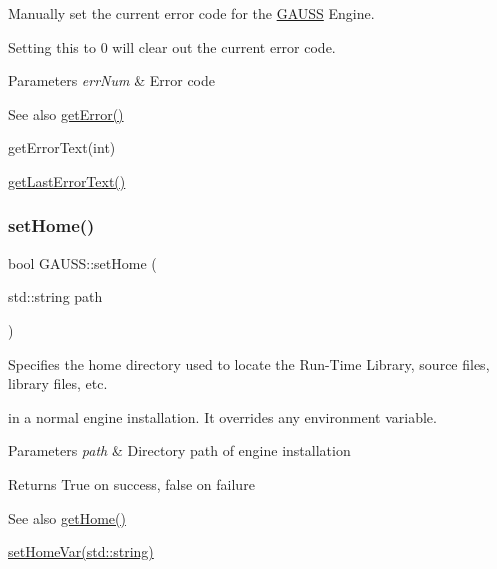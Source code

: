 Manually set the current error code for the \hyperlink{class_g_a_u_s_s}{G\+A\+U\+SS} Engine. 

Setting this to 0 will clear out the current error code.


\begin{DoxyParams}{Parameters}
{\em err\+Num} & Error code\\
\hline
\end{DoxyParams}
\begin{DoxySeeAlso}{See also}
\hyperlink{class_g_a_u_s_s_a214b7c251ff80099c04a49e5b5032926}{get\+Error()} 

get\+Error\+Text(int) 

\hyperlink{class_g_a_u_s_s_a4d8c56b05b0878aa3831ba465c409235}{get\+Last\+Error\+Text()} 
\end{DoxySeeAlso}
\mbox{\label{class_g_a_u_s_s_ac34645a05f3aca7d56d11d0b895fb33a}} 
\subsubsection{\texorpdfstring{set\+Home()}{setHome()}}
{\footnotesize\ttfamily bool G\+A\+U\+S\+S\+::set\+Home (\begin{DoxyParamCaption}\item[{std\+::string}]{path }\end{DoxyParamCaption})}



Specifies the home directory used to locate the Run-\/\+Time Library, source files, library files, etc. 

in a normal engine installation. It overrides any environment variable.


\begin{DoxyParams}{Parameters}
{\em path} & Directory path of engine installation \\
\hline
\end{DoxyParams}
\begin{DoxyReturn}{Returns}
True on success, false on failure
\end{DoxyReturn}
\begin{DoxySeeAlso}{See also}
\hyperlink{class_g_a_u_s_s_a917690c72f22ff82e13c49c5686af1dd}{get\+Home()} 

\hyperlink{class_g_a_u_s_s_ad2935b18b45d55903bb5025143dffab4}{set\+Home\+Var(std\+::string)} 
\end{DoxySeeAlso}
\mbox{\label{class_g_a_u_s_s_ad2935b18b45d55903bb5025143dffab4}} 
